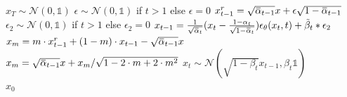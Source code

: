 \documentclass{article}
\newcommand{\overbar}[1]{\mkern 1.5mu\overline{\mkern-1.5mu#1\mkern-1.5mu}\mkern 1.5mu}
\begin{document}
\begin{algorithm}[t]
	\caption{Our fuzzy-conditioned image diffusion} 
	\begin{algorithmic}[1]
        \State $x_T \sim \mathcal{N}(0,\mathbb{1})$
				\State $\epsilon \sim \mathcal{N}(0,\mathbb{1})$ if $t>1$ else $\epsilon=0$
                \State $x^r_{t-1} = \sqrt{\overbar{\alpha}_{t-1}} x + \epsilon \sqrt{1-\overbar{\alpha}_{t-1}}$
                \State $\epsilon_2\sim \mathcal{N}(0,\mathbb{1})$ if $t>1$ else $\epsilon_2=0$
                \State $x_{t-1} = \frac{1}{\sqrt{\overbar{\alpha}_t}} (x_t-\frac{1-\alpha_t}{\sqrt{1-\overbar{\alpha}_t}}) \epsilon_\theta(x_t,t) + \tilde{\beta}_t*\epsilon_2$
                \State $x_m = m \cdot x^r_{t-1} + (1-m)\cdot x_{t-1} - \sqrt{\overbar{\alpha}_{t-1}} x$
                \State $x_m = \sqrt{\overbar{\alpha}_{t-1}} x + x_m / \sqrt{1-2\cdot m + 2\cdot m^2}$
	             {\newline
                    \hspace*{4.2em} $x_t\sim \mathcal{N}(\sqrt{1-\beta_{t}}x_{t-1}, \beta_{t}\mathbb{1})$
                } \EndIf
            \EndFor
		\EndFor \\
    \Return $x_0$
	\end{algorithmic} 
 \label{algo}
\end{algorithm}
\end{document}
